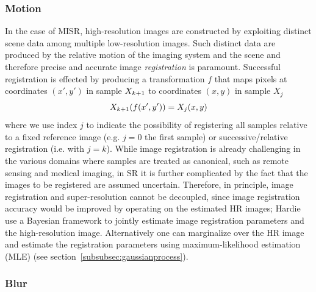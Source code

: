 \subsubsection{Motion}

In the case of MISR, high-resolution images are constructed by exploiting distinct scene data among multiple low-resolution images.
%
Such distinct data are produced by the relative motion of the imaging system and the scene and therefore precise and accurate image \textit{registration} is paramount.
%
Successful registration is effected by producing a transformation $f$ that maps pixels at coordinates $(x',y')$ in sample $X_{k+1}$ to coordinates $(x,y)$ in sample $X_j$
\begin{equation}
    X_{k+1}(f(x', y')) = X_j(x,y)
    \label{eqn:registration}
\end{equation}
where we use index $j$ to indicate the possibility of registering all samples relative to a fixed reference image (e.g. $j=0$ the first sample) or successive/relative registration (i.e. with $j=k$).
%
While image registration is already challenging in the various domains where samples are treated as canonical, such as remote sensing and medical imaging, in SR it is further complicated by the fact that the images to be registered are assumed uncertain.
%
Therefore, in principle, image registration and super-resolution cannot be decoupled, since image registration accuracy would be improved by operating on the estimated HR images;
%
Hardie \etal~\cite{Hardie1997} use a Bayesian framework to jointly estimate image registration parameters and the high-resolution image\cite{Hardie1997}.
%
Alternatively one can marginalize over the HR image and estimate the registration parameters using maximum-likelihood estimation (MLE) (see section~\ref{subsubsec:gaussianprocess}).

\subsubsection{Blur}

